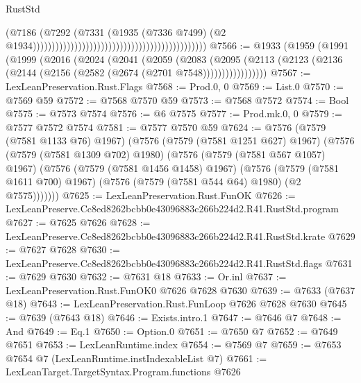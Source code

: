 \begin{lexlean}{RustStd}
\begin{coremodule}
                                                                                      (@7186
                                                                                        (@7292
                                                                                          (@7331
                                                                                            (@1935
                                                                                              (@7336
                                                                                                @7499)
                                                                                              (@2
                                                                                                @1934))))))))))))))))))))))))))))))))))))))))))))))
@7566 := @1933
    (@1959
      (@1991
        (@1999
          (@2016
            (@2024
              (@2041
                (@2059
                  (@2083
                    (@2095
                      (@2113 (@2123 (@2136 (@2144 (@2156 (@2582 (@2674 (@2701 @7548)))))))))))))))))
@7567 := LexLeanPreservation.Rust.Flags
@7568 := Prod.{0, 0}
@7569 := List.{0}
@7570 := @7569 @59
@7572 := @7568 @7570 @59
@7573 := @7568 @7572
@7574 := Bool
@7575 := @7573 @7574
@7576 := @6 @7575
@7577 := Prod.mk.{0, 0}
@7579 := @7577 @7572 @7574
@7581 := @7577 @7570 @59
@7624 := @7576
    (@7579 (@7581 @1133 @76) @1967)
    (@7576
      (@7579 (@7581 @1251 @627) @1967)
      (@7576
        (@7579 (@7581 @1309 @702) @1980)
        (@7576
          (@7579 (@7581 @567 @1057) @1967)
          (@7576
            (@7579 (@7581 @1456 @1458) @1967)
            (@7576
              (@7579 (@7581 @1611 @700) @1967)
              (@7576 (@7579 (@7581 @544 @64) @1980) (@2 @7575)))))))
@7625 := LexLeanPreservation.Rust.FunOK
@7626 := LexLeanPreserve.Cc8ed8262bcbb0e43096883c266b224d2.R41.RustStd.program
@7627 := @7625 @7626
@7628 := LexLeanPreserve.Cc8ed8262bcbb0e43096883c266b224d2.R41.RustStd.krate
@7629 := @7627 @7628
@7630 := LexLeanPreserve.Cc8ed8262bcbb0e43096883c266b224d2.R41.RustStd.flags
@7631 := @7629 @7630
@7632 := @7631 @18
@7633 := Or.inl
@7637 := LexLeanPreservation.Rust.FunOK0 @7626 @7628 @7630
@7639 := @7633 (@7637 @18)
@7643 := LexLeanPreservation.Rust.FunLoop @7626 @7628 @7630
@7645 := @7639 (@7643 @18)
@7646 := Exists.intro.{1}
@7647 := @7646 @7
@7648 := And
@7649 := Eq.{1}
@7650 := Option.{0}
@7651 := @7650 @7
@7652 := @7649 @7651
@7653 := LexLeanRuntime.index
@7654 := @7569 @7
@7659 := @7653 @7654 @7 (LexLeanRuntime.instIndexableList @7)
@7661 := LexLeanTarget.TargetSyntax.Program.functions @7626

\end{coremodule}
\end{lexlean}

